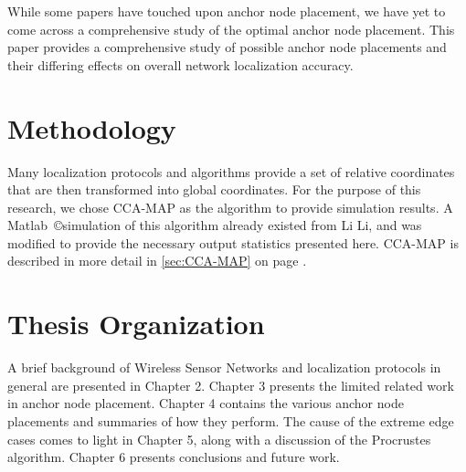 While some papers have touched upon anchor node placement, we have yet to come across a comprehensive study of the optimal anchor node placement.  This paper provides a comprehensive study of possible anchor node placements and their differing effects on overall network localization accuracy.

\section{Methodology}
Many localization protocols and algorithms provide a set of relative coordinates that are then transformed into global coordinates.  For the purpose of this research, we chose CCA-MAP\cite{CCA-MAP07,CCA-MAP09} as the algorithm to provide simulation results.  A Matlab~\copyright simulation of this algorithm already existed from Li Li\cite{CCA-MAP07}, and was modified to provide the necessary output statistics presented here.  CCA-MAP is described in more detail in \ref{sec:CCA-MAP} on page \pageref{sec:CCA-MAP}.

\section{Thesis Organization}
A brief background of Wireless Sensor Networks and localization protocols in general are presented in Chapter 2.  Chapter 3 presents the limited related work in anchor node placement.  Chapter 4 contains the various anchor node placements and summaries of how they perform.  The cause of the extreme edge cases comes to light in Chapter 5, along with a discussion of the Procrustes algorithm.  Chapter 6 presents conclusions and future work.

